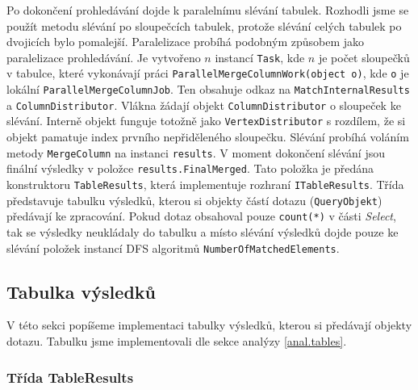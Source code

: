 Po dokončení prohledávání dojde k paralelnímu slévání tabulek.
Rozhodli jsme se použít metodu slévání po sloupečcích tabulek, protože slévání celých tabulek po dvojicích bylo pomalejší.
Paralelizace probíhá podobným způsobem jako paralelizace prohledávání.
Je vytvořeno $n$ instancí \texttt{Task}, kde $n$ je počet sloupečků v tabulce, které vykonávají práci \texttt{ParallelMergeColumnWork(object o)}, kde \texttt{o} je lokální \texttt{ParallelMergeColumnJob}.
Ten obsahuje odkaz na \texttt{MatchInternalResults} a \texttt{ColumnDistributor}.
Vlákna žádají objekt \texttt{ColumnDistributor} o sloupeček ke slévání.
Interně objekt funguje totožně jako \texttt{VertexDistributor} s rozdílem, že si objekt pamatuje index prvního nepřiděleného sloupečku.
Slévání probíhá voláním metody \texttt{MergeColumn} na instanci \texttt{results}.
V moment dokončení slévání jsou finální výsledky v položce \texttt{results.FinalMerged}.
Tato položka je předána konstruktoru \texttt{TableResults}, která implementuje rozhraní \texttt{ITableResults}.
Třída představuje tabulku výsledků, kterou si objekty částí dotazu (\texttt{QueryObjekt}) předávají ke zpracování.
Pokud dotaz obsahoval pouze \texttt{count(*)} v části \textit{Select}, tak se výsledky neukládaly do tabulku a místo slévání výsledků dojde pouze ke slévání položek instancí DFS algoritmů \texttt{NumberOfMatchedElements}.

\subsection{Tabulka výsledků} \label{impl.table}

V této sekci popíšeme implementaci tabulky výsledků, kterou si předávají objekty dotazu.
Tabulku jsme implementovali dle sekce analýzy \ref{anal.tables}.

\subsubsection{Třída TableResults}

